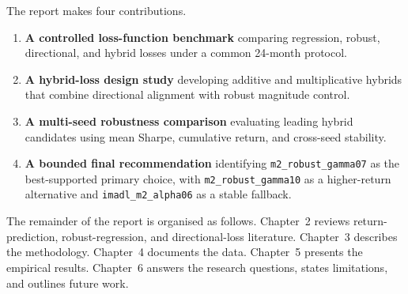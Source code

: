 \label{ch1:contributions}

The report makes four contributions.

\begin{enumerate}
    \item \textbf{A controlled loss-function benchmark} comparing regression, robust, directional, and hybrid losses under a common 24-month protocol.
    \item \textbf{A hybrid-loss design study} developing additive and multiplicative hybrids that combine directional alignment with robust magnitude control.
    \item \textbf{A multi-seed robustness comparison} evaluating leading hybrid candidates using mean Sharpe, cumulative return, and cross-seed stability.
    \item \textbf{A bounded final recommendation} identifying \texttt{m2\_robust\_gamma07} as the best-supported primary choice, with \texttt{m2\_robust\_gamma10} as a higher-return alternative and \texttt{imadl\_m2\_alpha06} as a stable fallback.
\end{enumerate}

The remainder of the report is organised as follows. Chapter~2 reviews return-prediction, robust-regression, and directional-loss literature. Chapter~3 describes the methodology. Chapter~4 documents the data. Chapter~5 presents the empirical results. Chapter~6 answers the research questions, states limitations, and outlines future work.
